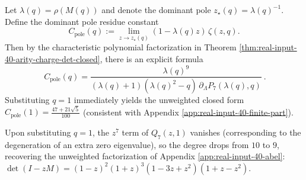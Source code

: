 \begin{proposition}\label{prop:real-input-40-arity-charge-residue}
Let $\lambda(q)=\rho(M(q))$ and denote the dominant pole $z_\star(q)=\lambda(q)^{-1}$. Define the dominant pole residue constant
\[
C_{\mathrm{pole}}(q):=\lim_{z\to z_\star(q)}(1-\lambda(q)z)\,\zeta(z,q).
\]
Then by the characteristic polynomial factorization in Theorem \ref{thm:real-input-40-arity-charge-det-closed}, there is an explicit formula
\[
\boxed{\
C_{\mathrm{pole}}(q)=\frac{\lambda(q)^9}{(\lambda(q)+1)(\lambda(q)^2-q)\,\partial_\Lambda P_7(\lambda(q),q)}\ }.
\]
Substituting $q=1$ immediately yields the unweighted closed form $C_{\mathrm{pole}}(1)=\frac{47+21\sqrt5}{100}$ (consistent with Appendix \ref{app:real-input-40-finite-part}).
\end{proposition}

\begin{remark}[Exact alignment with the unweighted determinant at $q=1$]
Upon substituting $q=1$, the $z^7$ term of $Q_7(z,1)$ vanishes (corresponding to the degeneration of an extra zero eigenvalue), so the degree drops from $10$ to $9$,
recovering the unweighted factorization of Appendix \ref{app:real-input-40-abel}:
\(
\det(I-zM)=(1-z)^2(1+z)^3(1-3z+z^2)(1+z-z^2)
\).
\end{remark}

